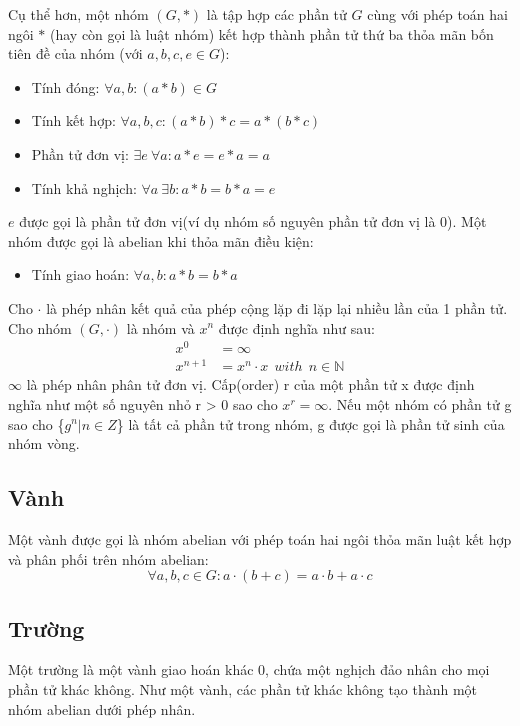 \documentclass[a4paper,12pt]{report}
\begin{document}
Cụ thể hơn, một nhóm $(G, *)$ là tập hợp các phần tử $G$ cùng với phép toán hai ngôi $*$ (hay còn gọi là luật nhóm) kết hợp thành phần tử thứ ba thỏa mãn bốn tiên đề của nhóm (với $ a, b , c, e \in G$):
\begin{itemize}
\item Tính đóng: $\forall a, b: (a * b) \in G$
\item Tính kết hợp: $\forall a, b, c: (a * b) * c = a * (b * c)$
\item Phần tử đơn vị: $\exists e \ \forall a: a * e = e * a = a$
\item Tính khả nghịch: $\forall a \ \exists b: a * b = b * a = e$
\end{itemize}
$e$ được gọi là phần tử đơn vị(ví dụ nhóm số nguyên phần tử đơn vị là 0). Một nhóm được gọi là abelian  khi thỏa mãn điều kiện:
\begin{itemize}
\item Tính giao hoán: $\forall a,b: a * b = b * a$
\end{itemize}

Cho $\cdot$ là phép nhân kết quả của phép cộng lặp đi lặp lại nhiều lần của 1 phần tử. Cho nhóm $(G, \cdot)$ là nhóm và $x^n$ được định nghĩa như sau:
\begin{displaymath}
\begin{aligned}
x^0 & = \infty \\
x^{n + 1} & = x^n\cdot x \ \ with \ \ n \in \mathbb{N}
\end{aligned}
\end{displaymath}
$\infty$ là phép nhân phân tử đơn vị. Cấp(order) r của một phần tử x được định nghĩa như một số nguyên nhỏ r > 0 sao cho $x^r = \infty$. Nếu một nhóm có phần tử g sao cho \{$g^n | n \in Z$\} là tất cả phần tử trong nhóm, g được gọi là phần tử sinh của nhóm vòng.
\subsection*{Vành}
Một vành được gọi là nhóm abelian  với phép toán hai ngôi thỏa mãn luật kết hợp và phân phối trên nhóm abelian:
\begin{displaymath}
\forall a, b, c \in G: a\cdot (b + c) = a \cdot b + a \cdot c
\end{displaymath}
\subsection*{Trường}
Một trường là một vành giao hoán khác 0, chứa một nghịch đảo nhân cho mọi phần tử khác không. Như một vành, các phần tử khác không tạo thành một nhóm abelian dưới phép nhân.
\end{document}
